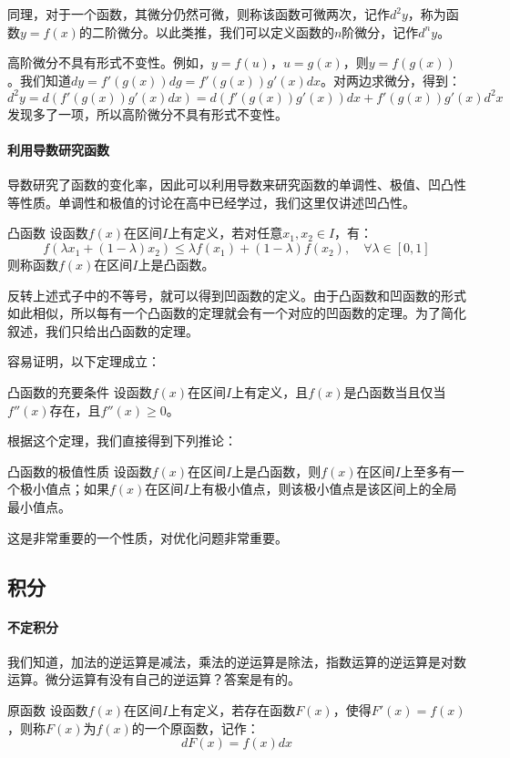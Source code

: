 同理，对于一个函数，其微分仍然可微，则称该函数可微两次，记作$d^2y$，称为函数$y = f(x)$的二阶微分。以此类推，我们可以定义函数的$n$阶微分，记作$d^ny$。

高阶微分不具有形式不变性。例如，$y = f(u)$，$u = g(x)$，则$y = f(g(x))$。我们知道$dy = f'(g(x)) dg = f'(g(x)) g'(x) dx$。对两边求微分，得到：
\begin{equation}
    d^2y = d(f'(g(x)) g'(x) dx) = d(f'(g(x)) g'(x)) dx + f'(g(x)) g'(x) d^2x
\end{equation}
发现多了一项，所以高阶微分不具有形式不变性。

\paragraph{利用导数研究函数} 导数研究了函数的变化率，因此可以利用导数来研究函数的单调性、极值、凹凸性等性质。单调性和极值的讨论在高中已经学过，我们这里仅讲述凹凸性。

\begin{definition}{凸函数}{}
    设函数$f(x)$在区间$I$上有定义，若对任意$x_1, x_2 \in I$，有：
    \begin{equation}
        f(\lambda x_1 + (1 - \lambda) x_2) \le \lambda f(x_1) + (1 - \lambda) f(x_2), \quad \forall \lambda \in [0, 1]
    \end{equation}
    则称函数$f(x)$在区间$I$上是凸函数。
\end{definition}

反转上述式子中的不等号，就可以得到凹函数的定义。由于凸函数和凹函数的形式如此相似，所以每有一个凸函数的定理就会有一个对应的凹函数的定理。为了简化叙述，我们只给出凸函数的定理。

容易证明，以下定理成立：
\begin{theorem}{凸函数的充要条件}{}
    设函数$f(x)$在区间$I$上有定义，且$f(x)$是凸函数当且仅当$f''(x)$存在，且$f''(x) \ge 0$。
\end{theorem}

根据这个定理，我们直接得到下列推论：
\begin{corollary}{凸函数的极值性质}{}
    设函数$f(x)$在区间$I$上是凸函数，则$f(x)$在区间$I$上至多有一个极小值点；如果$f(x)$在区间$I$上有极小值点，则该极小值点是该区间上的全局最小值点。
\end{corollary}
这是非常重要的一个性质，对优化问题非常重要。

\subsection{积分}
\paragraph{不定积分} 我们知道，加法的逆运算是减法，乘法的逆运算是除法，指数运算的逆运算是对数运算。微分运算有没有自己的逆运算？答案是有的。
\begin{definition}{原函数}{}
    设函数$f(x)$在区间$I$上有定义，若存在函数$F(x)$，使得$F'(x) = f(x)$，则称$F(x)$为$f(x)$的一个原函数，记作：
    \begin{equation}
        d F(x) = f(x) dx
    \end{equation}
\end{definition}

